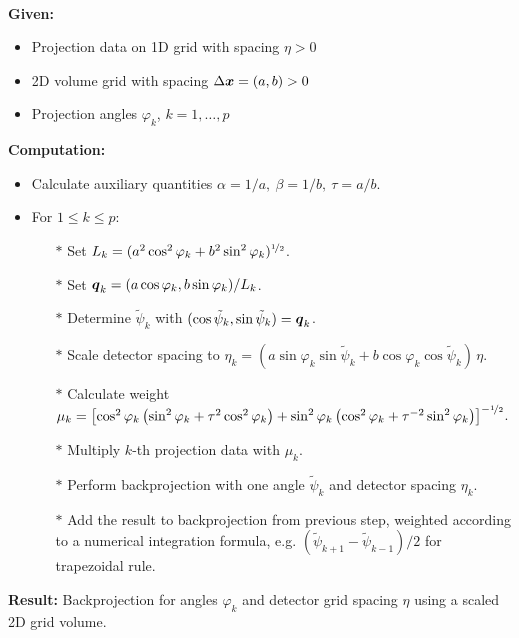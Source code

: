\documentclass{amsart}
\renewcommand*{\phi}{\varphi}
\begin{document}
\begin{algorithm}~\\[2ex]
 \textbf{Given:}
 \begin{itemize}
  \item Projection data on 1D grid with spacing $\eta > 0$
  \item 2D volume grid with spacing $\Delta{\boldsymbol{x}} = (a, b) > 0$
  \item Projection angles $\phi_k$, $k = 1, \ldots, p$
 \end{itemize}
 \vspace*{2ex}
 \textbf{Computation:}
 \begin{itemize}
  \item Calculate auxiliary quantities $\alpha = 1 / a,\ \beta = 1 / b,\ \tau = a / b$.
  \item For $1 \leq k \leq p$:
  \begin{itemize}
   \item[$\ast$] Set $L_k = (a^2 \cos^2\phi_k + b^2 \sin^2\phi_k)^{\HALF}$.
   \item[$\ast$] Set $\Bq_k = (a \cos\phi_k, b \sin\phi_k) / L_k$.
   \item[$\ast$] Determine $\tilde\psi_k$ with $(\cos\tilde\psi_k, \sin\tilde\psi_k) = {\boldsymbol{q}}_k$.
   \item[$\ast$] Scale detector spacing to $\eta_k = (a \sin\phi_k \sin\tilde\psi_k + b \cos\phi_k \cos\tilde\psi_k)\, \eta$.
   \item[$\ast$] Calculate weight $\mu_k = \left[\cos^2\phi_k \left(\sin^2\phi_k + \tau^2 \cos^2\phi_k\right) +
   \sin^2\phi_k \left(\cos^2\phi_k + \tau^{-2} \sin^2\phi_k\right)\right]^{-\HALF}$.
   \item[$\ast$] Multiply $k$-th projection data with $\mu_k$.
   \item[$\ast$] Perform backprojection with one angle $\tilde\psi_k$ and detector spacing $\eta_k$.
   \item[$\ast$] Add the result to backprojection from previous step, weighted according to a numerical integration formula, e.g. 
   $(\tilde\psi_{k+1} - \tilde\psi_{k-1}) / 2$ for trapezoidal rule.
  \end{itemize}
 \end{itemize}
 \vspace*{2ex}
 \textbf{Result:} Backprojection for angles $\phi_k$ and detector grid spacing $\eta$ using a scaled 2D grid volume.
\end{algorithm}
\end{document}
